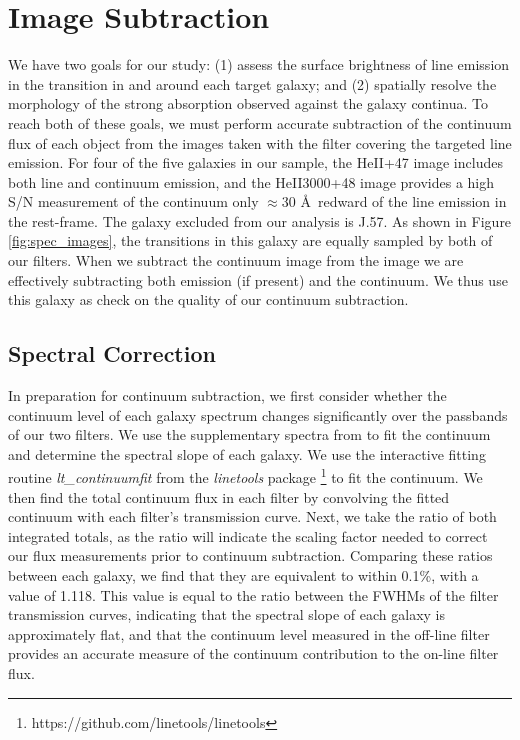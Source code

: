\documentclass[twocolumn]{aastex61}
\begin{document}
\section{Image Subtraction}\label{sec.cont_sub}
We have two goals for our study: (1) assess the surface brightness of line emission in the  transition in and around each target galaxy; and (2) spatially resolve the morphology of the strong  absorption observed against the galaxy continua.
To reach both of these goals, we must perform accurate subtraction of the continuum flux of each object from the images taken with the filter covering the targeted line emission. For four of the five galaxies in our sample, the HeII+47 image includes both line and continuum emission, and the HeII3000+48 image provides a high S/N measurement of the continuum only $\approx30$ \AA\ redward of the line emission in the rest-frame. The galaxy excluded from our analysis is J.57. As shown in Figure \ref{fig:spec_images}, the  transitions in this galaxy are equally sampled by both of our filters. When we subtract the continuum image from the  image we are effectively subtracting both  emission (if present) and the continuum. We thus use this galaxy as check on the quality of our continuum subtraction.

\subsection{Spectral Correction}
In preparation for continuum subtraction, we first consider whether the continuum level of each galaxy spectrum changes significantly over the passbands of our two filters.
We use the supplementary spectra from \citet{Rubin_2014} to fit the continuum and determine the spectral slope of each galaxy. We use the interactive fitting routine \emph{lt\_continuumfit} from the \emph{linetools} package \citep{Prochaska2016}\footnote{https://github.com/linetools/linetools} to fit the continuum. We then find the total continuum flux in each filter by convolving the fitted continuum with each filter's transmission curve. Next, we take the ratio of both integrated totals, as the ratio will indicate the scaling factor needed to correct our flux measurements prior to continuum subtraction. Comparing these ratios between each galaxy, we find that they are equivalent to within 0.1\%, with a value of 1.118. This value is equal to the ratio between the FWHMs of the filter transmission curves, indicating that the spectral slope of each galaxy is approximately flat, and that the continuum level measured in the off-line filter provides an accurate measure of the continuum contribution to the on-line filter flux.
\end{document}
